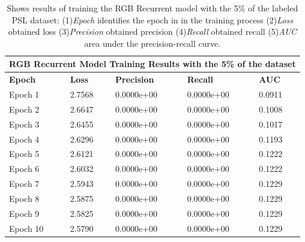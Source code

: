 \documentclass[twocolumn,conference]{article}
\begin{document}
\begin{table}[!htb]
\captionsetup{font=footnotesize}
\centering
\begin{tabular}{ p{2.8cm} p{2.8cm} p{2.8cm} p{2.8cm} p{2.8cm} }
\toprule
\multicolumn{5}{c}{\textbf{RGB Recurrent Model Training Results with the 5\% of the dataset}} \\
\hline
\hline
\textbf{Epoch}&	\textbf{Loss}	&\textbf{Precision}	&\textbf{Recall}	&\textbf{AUC} \\
\hline
\midrule
Epoch 1&	2.7568&	0.0000e+00&	0.0000e+00&	0.0911\\
Epoch 2&	2.6647&	0.0000e+00&	0.0000e+00&	0.1008\\
Epoch 3&	2.6455&	0.0000e+00&	0.0000e+00&	0.1017\\
Epoch 4&	2.6296&	0.0000e+00&	0.0000e+00&	0.1193\\
Epoch 5&	2.6121&	0.0000e+00&	0.0000e+00&	0.1222\\
Epoch 6&	2.6032&	0.0000e+00&	0.0000e+00&	0.1222\\
Epoch 7&	2.5943&	0.0000e+00&	0.0000e+00&	0.1229\\
Epoch 8&	2.5875&	0.0000e+00&	0.0000e+00&	0.1229\\
Epoch 9&	2.5825&	0.0000e+00&	0.0000e+00&	0.1229\\
Epoch 10&	2.5790&	0.0000e+00&	0.0000e+00&	0.1229\\
\bottomrule
\end{tabular}
\caption{Shows results of training the RGB Recurrent model with the 5\% of the labeled PSL dataset: (1)\textit{Epoch} identifies the epoch in in the training process (2)\textit{Loss} obtained loss (3)\textit{Precision} obtained precision (4)\textit{Recall} obtained recall (5)\textit{AUC} area under the precision-recall curve.}
\label{tab:rgb-detection-results-5-percent}
\end{table}
\end{document}
